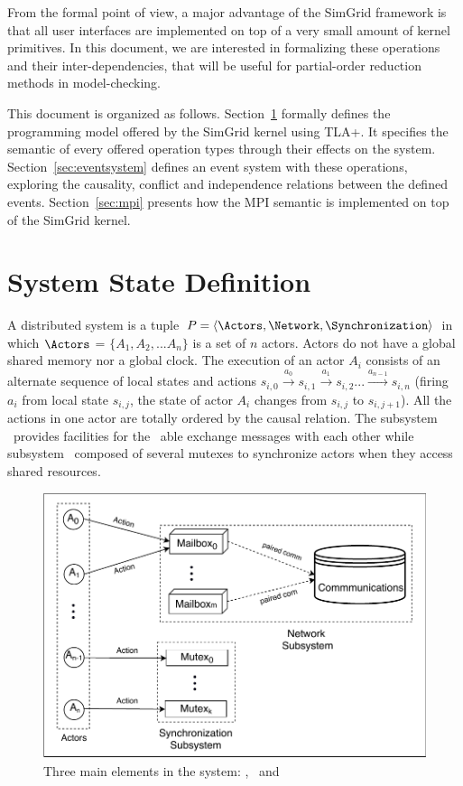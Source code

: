 \documentclass[a4paper,11pt]{article}
\theoremstyle{break}
\begin{document}
From the formal point of view, a major advantage of the SimGrid framework is that all user interfaces are implemented on top of a very small amount of kernel primitives.
In this document, we are interested in formalizing these operations and their inter-dependencies, that will be useful for partial-order reduction methods  in model-checking.

\medskip
This document is organized as follows. Section~\ref{sec:sysdef} formally defines the programming model offered by the SimGrid kernel using TLA+. It specifies the semantic of every offered operation types through their effects on the system. Section~\ref{sec:eventsystem} defines an event system with these operations, exploring the causality, conflict and independence relations between the defined events. Section~\ref{sec:mpi} presents how the MPI semantic is implemented on top of the SimGrid kernel. 
\newpage 
\section{System State Definition}\label{sec:sysdef}


A distributed system is a tuple $P=\langle \Actors, \Network, \Synchronization \rangle$ in which  $\Actors$ = $\{ A_1, A_2, ... A_n\}$ is a set of $n$ actors. Actors do not have a global shared memory nor a global clock. The execution of an actor $A_i$ consists of an alternate sequence of local states and actions $s_{i,0}\xrightarrow{\text{$a_0$}} s_{i,1} \xrightarrow{\text{$a_1$}}s_{i,2} ... \xrightarrow{\text{$a_{n-1}$}}s_{i,n}$ (firing $a_i$ from local state $s_{i,j}$, the state of actor $A_i$ changes from $s_{i,j}$ to $s_{i,j+1}$).
All the actions in one actor are totally ordered by the causal relation. The subsystem \Network~provides facilities for the \Actors~able exchange messages with each other while subsystem \Synchronization~composed of several mutexes to synchronize actors when they access shared resources. 
\begin{figure}[H]
	\centerline{\includegraphics[scale=0.8]{Figures/System.pdf}}
	\caption{Three main elements in the system: \Actors, \Network~and \Synchronization}
\end{figure}
\end{document}

